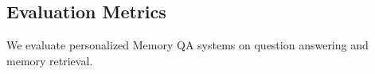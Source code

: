 \documentclass{article}
\theoremstyle{plain}
\theoremstyle{definition}
\theoremstyle{remark}
\begin{document}

\subsection{Evaluation Metrics}
We evaluate personalized Memory QA systems on question answering and memory retrieval.
\end{document}

